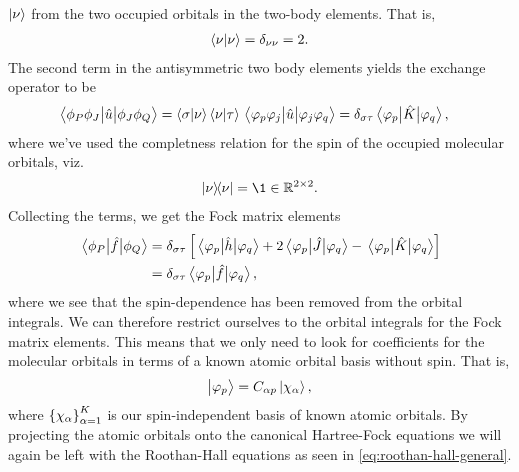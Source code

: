             $\ket{\nu}$ from the two occupied orbitals in the two-body elements.
            That is,
            \begin{align}
                \braket{\nu}{\nu} = \delta_{\nu\nu} = 2.
            \end{align}
            The second term in the antisymmetric two body elements yields the
            exchange operator to be
            \begin{align}
                \mel{\phi_P\phi_J}{\hat{u}}{\phi_J\phi_Q}
                &= \braket{\sigma}{\nu}\braket{\nu}{\tau}
                \mel{\varphi_p\varphi_j}{\hat{u}}{\varphi_j\varphi_q}
                = \delta_{\sigma\tau}
                \mel{\varphi_p}{\hat{K}}{\varphi_q},
            \end{align}
            where we've used the completness relation for the spin of the
            occupied molecular orbitals, viz.
            \begin{align}
                \dyad{\nu}
                = \1 \in \mathbb{R}^{2 \times 2}.
            \end{align}
            Collecting the terms, we get the Fock matrix elements
            \begin{align}
                \mel{\phi_P}{\hat{f}}{\phi_Q}
                &=
                \delta_{\sigma\tau}
                \left[ 
                    \mel{\varphi_p}{\hat{h}}{\varphi_q}
                    +
                    2
                    \mel{\varphi_p}{\hat{J}}{\varphi_q}
                    -
                    \mel{\varphi_p}{\hat{K}}{\varphi_q}
                 \right]
                \\
                &= \delta_{\sigma\tau}
                \mel{\varphi_p}{\hat{f}}{\varphi_q},
            \end{align}
            where we see that the spin-dependence has been removed from the
            orbital integrals.
            We can therefore restrict ourselves to the orbital integrals for the
            Fock matrix elements.
            This means that we only need to look for coefficients for the
            molecular orbitals in terms of a known atomic orbital basis without
            spin.
            That is,
            \begin{align}
                \ket{\varphi_p} = C_{\alpha p} \ket{\chi_{\alpha}},
            \end{align}
            where $\left\{ \chi_{\alpha} \right\}_{\alpha = 1}^{K}$ is our
            spin-independent basis of known atomic orbitals.
            By projecting the atomic orbitals onto the canonical Hartree-Fock
            equations we will again be left with the Roothan-Hall equations as
            seen in \autoref{eq:roothan-hall-general}.

